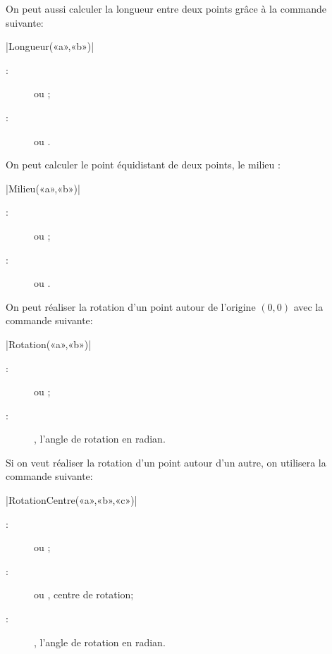 \documentclass[a4paper,french]{article}
\begin{document}
On peut aussi calculer la longueur entre deux points grâce à la commande
suivante:
\begin{colourband}
\macro|Longueur(«a»,«b»)|
\begin{description}
  \item[:]  ou ;
  \item[:]  ou .
\end{description}
\end{colourband}

On peut calculer le point équidistant de deux points, le milieu :
\begin{colourband}
\macro|Milieu(«a»,«b»)|
\begin{description}
  \item[:]  ou ;
  \item[:]  ou .
\end{description}
\end{colourband}

On peut réaliser la rotation d'un point autour de l'origine $(0,0)$ avec la
commande suivante:
\begin{colourband}
\macro|Rotation(«a»,«b»)|
\begin{description}
  \item[:]  ou ;
  \item[:] , l'angle de rotation en radian.
\end{description}
\end{colourband}

Si on veut réaliser la rotation d'un point autour d'un autre, on utilisera la
commande suivante:
\begin{colourband}
\macro|RotationCentre(«a»,«b»,«c»)|
\begin{description}
  \item[:]  ou ;
  \item[:]  ou , centre de rotation;
  \item[:] , l'angle de rotation en radian.
\end{description}
\end{colourband}
\end{document}
